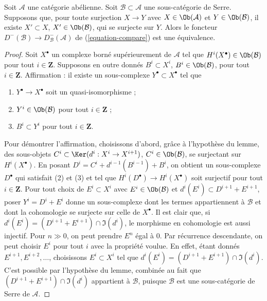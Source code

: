 \begin{lemma}
\label{lemma-fully-faithful-embedding}
Soit $\mathcal{A}$ une catégorie abélienne. Soit
$\mathcal{B} \subset \mathcal{A}$ une sous-catégorie de Serre. Supposons que,
pour toute surjection $X \to Y$ avec $X \in \Ob(\mathcal{A})$ et
$Y \in \Ob(\mathcal{B})$, il existe $X' \subset X$,
$X' \in \Ob(\mathcal{B})$, qui se surjecte sur $Y$. Alors le foncteur
$D^-(\mathcal{B}) \to D^-_\mathcal{B}(\mathcal{A})$ de
(\ref{equation-compare}) est une équivalence.
\end{lemma}

\begin{proof}
Soit $X^\bullet$ un complexe borné supérieurement de $\mathcal{A}$ tel que
$H^i(X^\bullet) \in \Ob(\mathcal{B})$ pour tout $i \in \mathbf{Z}$.
Supposons en outre donnés $B^i \subset X^i$,
$B^i \in \Ob(\mathcal{B})$, pour tout $i \in \mathbf{Z}$. Affirmation : il
existe un sous-complexe $Y^\bullet \subset X^\bullet$ tel que
\begin{enumerate}
\item $Y^\bullet \to X^\bullet$ soit un quasi-isomorphisme ;
\item $Y^i \in \Ob(\mathcal{B})$ pour tout $i \in \mathbf{Z}$ ;
\item $B^i \subset Y^i$ pour tout $i \in \mathbf{Z}$.
\end{enumerate}
Pour démontrer l'affirmation, choisissons d'abord, grâce à l'hypothèse du
lemme, des sous-objets
$C^i \subset \Ker(d^i : X^i \to X^{i + 1})$,
$C^i \in \Ob(\mathcal{B})$, se surjectant sur $H^i(X^\bullet)$. En posant
$D^i = C^i + d^{i - 1}(B^{i - 1}) + B^i$, on obtient un sous-complexe
$D^\bullet$ qui satisfait (2) et (3) et tel que
$H^i(D^\bullet) \to H^i(X^\bullet)$ soit surjectif pour tout
$i \in \mathbf{Z}$. Pour tout choix de $E^i \subset X^i$ avec
$E^i \in \Ob(\mathcal{B})$ et
$d^i(E^i) \subset D^{i + 1} + E^{i + 1}$, poser
$Y^i = D^i + E^i$ donne un sous-complexe dont les termes appartiennent à
$\mathcal{B}$ et dont la cohomologie se surjecte sur celle de $X^\bullet$. Il
est clair que, si
$d^i(E^i) = (D^{i + 1} + E^{i + 1}) \cap \Im(d^i)$, le morphisme en
cohomologie est aussi injectif. Pour $n \gg 0$, on peut prendre $E^n$ égal à
$0$. Par récurrence descendante, on peut choisir $E^i$ pour tout $i$ avec la propriété
voulue. En effet, étant donnés $E^{i + 1}, E^{i + 2}, \ldots$, choisissons
$E^i \subset X^i$ tel que
$d^i(E^i) = (D^{i + 1} + E^{i + 1}) \cap \Im(d^i)$. C'est possible par
l'hypothèse du lemme, combinée au fait que
$(D^{i + 1} + E^{i + 1}) \cap \Im(d^i)$ appartient à $\mathcal{B}$, puisque
$\mathcal{B}$ est une sous-catégorie de Serre de $\mathcal{A}$.


\end{proof}
